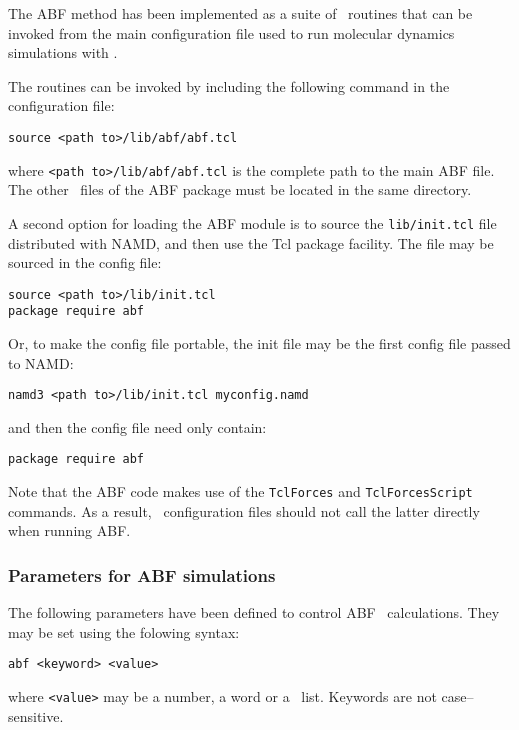 The ABF method has been implemented as a suite of \tcl \
routines that can be invoked from the main configuration file used
to run molecular dynamics simulations with \namd.

The routines can be invoked by including the following
command in the configuration file:

\begin{verbatim}
source <path to>/lib/abf/abf.tcl
\end{verbatim}

where \texttt{<path to>/lib/abf/abf.tcl} is the complete path to
the main ABF file. The other \tcl\ files of the ABF
package must be located in the same directory.

A second option for loading the ABF module is to source the
\texttt{lib/init.tcl} file distributed with NAMD, and then use the
Tcl package facility.  The file may be sourced in the config file:

\begin{verbatim}
source <path to>/lib/init.tcl
package require abf
\end{verbatim}

Or, to make the config file portable, the init file may be the
first config file passed to NAMD:

\begin{verbatim}
namd3 <path to>/lib/init.tcl myconfig.namd
\end{verbatim}

and then the config file need only contain:

\begin{verbatim}
package require abf
\end{verbatim}

Note that the ABF code makes use of the {\tt TclForces} and
{\tt TclForcesScript} commands.
As a result, \namd\ configuration files
should not call the latter directly when running ABF.



\subsubsection{Parameters for ABF simulations}


The following parameters have been defined to control ABF \
calculations. They may be set using the folowing syntax:

{\tt abf <keyword> <value>}

where {\tt <value>} may be a number, a word or a \tcl\ list.
Keywords are not case--sensitive.


